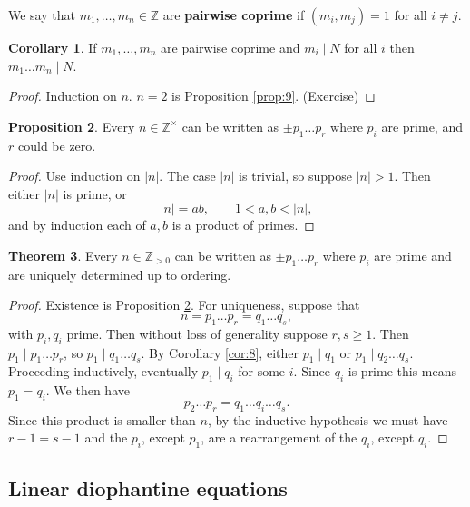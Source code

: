 \documentclass{article}
\newcommand{\Z}{\mathbb{Z}}
\newcommand{\rb}[1]{\left( #1 \right)}
\newcommand{\abs}[1]{\left\lvert #1 \right\rvert}
\theoremstyle{definition}\newtheorem{definition}{Definition}
\theoremstyle{definition}\newtheorem{remark}[definition]{Remark}
\theoremstyle{definition}\newtheorem*{example}{Example}
\theoremstyle{definition}\newtheorem*{note}{Note}
\newtheorem{proposition}[definition]{Proposition}
\newtheorem{theorem}[definition]{Theorem}
\newtheorem{corollary}[definition]{Corollary}
\begin{document}
We say that $ m_1, \dots, m_n \in \Z $ are \textbf{pairwise coprime} if $ \rb{m_i, m_j} = 1 $ for all $ i \ne j $.

\begin{corollary}
\label{cor:10}
If $ m_1, \dots, m_n $ are pairwise coprime and $ m_i \mid N $ for all $ i $ then $ m_1 \dots m_n \mid N $.
\end{corollary}

\begin{proof}
Induction on $ n $. $ n = 2 $ is Proposition \ref{prop:9}. (Exercise)
\end{proof}

\begin{proposition}
\label{prop:11}
Every $ n \in \Z^\times $ can be written as $ \pm p_1 \dots p_r $ where $ p_i $ are prime, and $ r $ could be zero.
\end{proposition}

\begin{proof}
Use induction on $ \abs{n} $. The case $ \abs{n} $ is trivial, so suppose $ \abs{n} > 1 $. Then either $ \abs{n} $ is prime, or
$$ \abs{n} = ab, \qquad 1 < a, b < \abs{n}, $$
and by induction each of $ a, b $ is a product of primes.
\end{proof}

\begin{theorem}
Every $ n \in \Z_{> 0} $ can be written as $ \pm p_1 \dots p_r $ where $ p_i $ are prime and are uniquely determined up to ordering.
\end{theorem}

\begin{proof}
Existence is Proposition \ref{prop:11}. For uniqueness, suppose that
$$ n = p_1 \dots p_r = q_1 \dots q_s, $$
with $ p_i, q_i $ prime. Then without loss of generality suppose $ r, s \ge 1 $. Then $ p_1 \mid p_1 \dots p_r $, so $ p_1 \mid q_1 \dots q_s $. By Corollary \ref{cor:8}, either $ p_1 \mid q_1 $ or $ p_1 \mid q_2 \dots q_s $. Proceeding inductively, eventually $ p_1 \mid q_i $ for some $ i $. Since $ q_i $ is prime this means $ p_1 = q_i $. We then have
$$ p_2 \dots p_r = q_1 \dots q_i \dots q_s. $$
Since this product is smaller than $ n $, by the inductive hypothesis we must have $ r - 1 = s - 1 $ and the $ p_i $, except $ p_1 $, are a rearrangement of the $ q_i $, except $ q_i $.
\end{proof}

\subsection{Linear diophantine equations}
\end{document}
